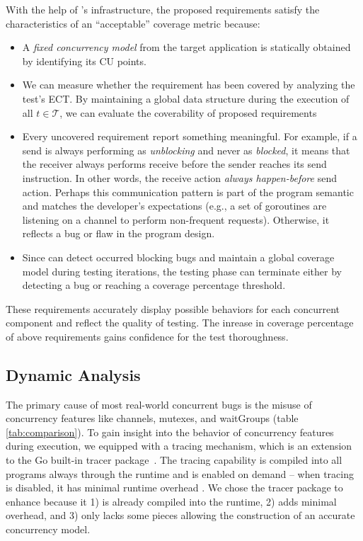 %
With the help of \goat's infrastructure, the proposed requirements satisfy the characteristics of an ``acceptable'' coverage metric because:
\begin{itemize}
  \item A \textit{fixed concurrency model} from the target application is statically obtained by identifying its CU points.
  \item We can measure whether the requirement has been covered by analyzing the test's ECT. By maintaining a global data structure during the execution of all $t \in \mathcal{T}$, we can evaluate the coverability of proposed requirements
  \item Every uncovered requirement report something meaningful. For example, if a send is always performing as \textit{unblocking} and never as \textit{blocked}, it means that the receiver always performs receive before the sender reaches its send instruction. In other words, the receive action \textit{always happen-before} send action. Perhaps this communication pattern is part of the program semantic and matches the developer's expectations (e.g., a set of goroutines are listening on a channel to perform non-frequent requests). Otherwise, it reflects a bug or flaw in the program design.
  \item Since \goat can detect occurred blocking bugs and maintain a global coverage model during testing iterations, the testing phase can terminate either by detecting a bug or reaching a coverage percentage threshold.
\end{itemize}

These requirements accurately display possible behaviors for each concurrent component and reflect the quality of testing.
%
The inrease in coverage percentage of above requirements gains confidence for the test thoroughness.

\subsection{Dynamic Analysis}
\label{sec:dynamic_analysis}
The primary cause of most real-world concurrent bugs is the misuse of concurrency features like channels, mutexes, and waitGroups (table \ref{tab:comparison}).
%
To gain insight into the behavior of concurrency features during execution, we equipped \goat with a tracing mechanism, which is an extension to the Go built-in tracer package~\cite{go-cmd-trace}.
%
The tracing capability is compiled into all programs always through the runtime and is enabled on demand -- when tracing is disabled, it has minimal runtime overhead \cite{go-exec-tracer-doc}.
%
We chose the tracer package to enhance because it 1) is already compiled into the runtime, 2) adds minimal overhead, and 3) only lacks some pieces allowing the construction of an accurate concurrency model.
%

